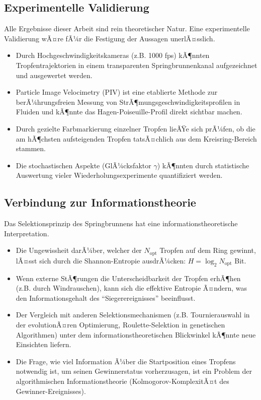 ﻿\documentclass[a4paper,12pt]{article}
\theoremstyle{definition}
\begin{document}
\subsection{Experimentelle Validierung}

Alle Ergebnisse dieser Arbeit sind rein theoretischer Natur. Eine experimentelle
Validierung wÃ¤re fÃ¼r die Festigung der Aussagen unerlÃ¤sslich.

\begin{itemize}
    \item Durch Hochgeschwindigkeitskameras (z.B. 1000 fps) kÃ¶nnten Tropfentrajektorien
          in einem transparenten Springbrunnenkanal aufgezeichnet und ausgewertet werden.
    \item Particle Image Velocimetry (PIV) ist eine etablierte Methode zur berÃ¼hrungs\-freien
          Messung von StrÃ¶mungsgeschwindigkeitsprofilen in Fluiden und kÃ¶nnte das
          Hagen-Poiseuille-Profil direkt sichtbar machen.
    \item Durch gezielte Farbmarkierung einzelner Tropfen lieÃŸe sich prÃ¼fen, ob die
          am hÃ¶chsten aufsteigenden Tropfen tatsÃ¤chlich aus dem Kreisring-Bereich stammen.
    \item Die stochastischen Aspekte (GlÃ¼cksfaktor $\gamma$) kÃ¶nnten durch statistische
          Auswertung vieler Wiederholungsexperimente quantifiziert werden.
\end{itemize}

\subsection{Verbindung zur Informationstheorie}

Das Selektionsprinzip des Springbrunnens hat eine informationstheoretische Interpretation.

\begin{itemize}
    \item Die Ungewissheit darÃ¼ber, welcher der $N_{\text{opt}}$ Tropfen auf dem Ring
          gewinnt, lÃ¤sst sich durch die Shannon-Entropie ausdrÃ¼cken:
          $H = \log_2 N_{\text{opt}}$ Bit.
    \item Wenn externe StÃ¶rungen die Unterscheidbarkeit der Tropfen erhÃ¶hen
          (z.B. durch Windrauschen), kann sich die effektive Entropie Ã¤ndern, was den
          Informationsgehalt des ``Siegerereignisses'' beeinflusst.
    \item Der Vergleich mit anderen Selektionsmechanismen (z.B. Tournierauswahl in der
          evolutionÃ¤ren Optimierung, Roulette-Selektion in genetischen Algorithmen)
          unter dem informationstheoretischen Blickwinkel kÃ¶nnte neue Einsichten liefern.
    \item Die Frage, wie viel Information Ã¼ber die Startposition eines Tropfens notwendig
          ist, um seinen Gewinnerstatus vorherzusagen, ist ein Problem der algorithmischen
          Informationstheorie (Kolmogorov-KomplexitÃ¤t des Gewinner-Ereignisses).
\end{itemize}
\end{document}
